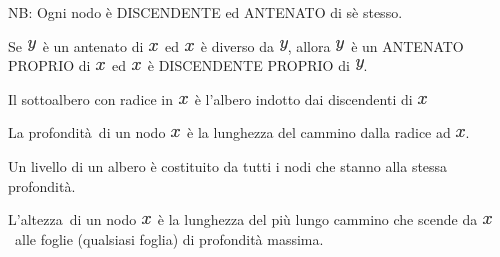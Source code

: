 \documentclass{article}
\begin{document}
{}

{NB: Ogni nodo è DISCENDENTE ed ANTENATO di sè stesso.}

{}

{Se }\includegraphics{images/image84.png}{~è un antenato di
}\includegraphics{images/image82.png}{~ed
}\includegraphics{images/image82.png}{~è diverso da
}\includegraphics{images/image84.png}{, allora
}\includegraphics{images/image84.png}{~è un ANTENATO PROPRIO di
}\includegraphics{images/image82.png}{~ed
}\includegraphics{images/image82.png}{~è DISCENDENTE PROPRIO di
}\includegraphics{images/image84.png}{.}

{Il sottoalbero con radice in }\includegraphics{images/image82.png}{~è
l'albero indotto dai discendenti di
}\includegraphics{images/image82.png}

{La profondità}{~di un nodo }\includegraphics{images/image82.png}{~è la
lunghezza del cammino dalla radice ad
}\includegraphics{images/image82.png}{.}

{Un livello di un albero è costituito da tutti i nodi che stanno alla
stessa profondità. }

{L'altezza}{~di un nodo }\includegraphics{images/image82.png}{~è la
lunghezza del più lungo cammino che scende da
}\includegraphics{images/image82.png}{~alle foglie (qualsiasi foglia) di
profondità massima.}
\end{document}
